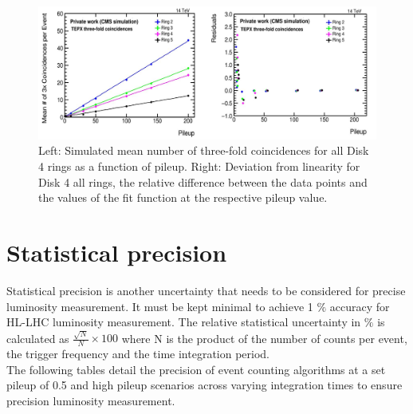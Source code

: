 \begin{figure}[H]
  \centering
  \includegraphics[width=1\columnwidth]{ashish_thesis/TEPX_threefold_linearity.png}
  \caption[Disk 4 all rings Three-Fold Coincidences Linearity]{Left: Simulated mean number of three-fold coincidences for all Disk 4 rings as a function
    of pileup. Right: Deviation from linearity for Disk 4 all rings, the relative difference between the data points and the values of the fit function at the respective pileup value.}
  \label{fig:tepx_3foldcoin_allPU_3}
\end{figure}

\newpage
\section{Statistical precision}

Statistical precision is another uncertainty that needs to be considered for precise luminosity measurement. It must be kept minimal to achieve 1 $\%$ accuracy for HL-LHC luminosity measurement. The relative statistical uncertainty in $\%$ is calculated as  $\frac{\sqrt{N}}{N} \times 100$ where N is the product of the number of counts per event, the trigger frequency and the time integration period.\\

The following tables detail the precision of event counting algorithms at a set pileup of 0.5 and high pileup scenarios across varying integration times to ensure precision luminosity measurement. 


